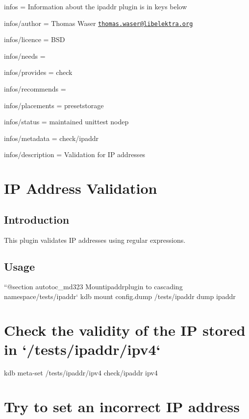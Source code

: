 
\begin{DoxyItemize}
\item infos = Information about the ipaddr plugin is in keys below
\item infos/author = Thomas Waser \href{mailto:thomas.waser@libelektra.org}{\tt thomas.\+waser@libelektra.\+org}
\item infos/licence = B\+SD
\item infos/needs =
\item infos/provides = check
\item infos/recommends =
\item infos/placements = presetstorage
\item infos/status = maintained unittest nodep
\item infos/metadata = check/ipaddr
\item infos/description = Validation for IP addresses
\end{DoxyItemize}\hypertarget{autotoc_md320_src_plugins_ipaddr_README_md}{}\section{I\+P Address Validation}\label{autotoc_md320_src_plugins_ipaddr_README_md}
\hypertarget{autotoc_md320_autotoc_md321}{}\subsection{Introduction}\label{autotoc_md320_autotoc_md321}
This plugin validates IP addresses using regular expressions.\hypertarget{autotoc_md320_autotoc_md322}{}\subsection{Usage}\label{autotoc_md320_autotoc_md322}
``{\ttfamily  @section autotoc\+\_\+md323 Mount}ipaddr{\ttfamily plugin to cascading namespace}/tests/ipaddr` kdb mount config.\+dump /tests/ipaddr dump ipaddr\hypertarget{autotoc_md320_autotoc_md324}{}\section{Check the validity of the I\+P stored in `/tests/ipaddr/ipv4`}\label{autotoc_md320_autotoc_md324}
kdb meta-\/set /tests/ipaddr/ipv4 check/ipaddr ipv4\hypertarget{autotoc_md320_autotoc_md325}{}\section{Try to set an incorrect I\+P address}\label{autotoc_md320_autotoc_md325}
